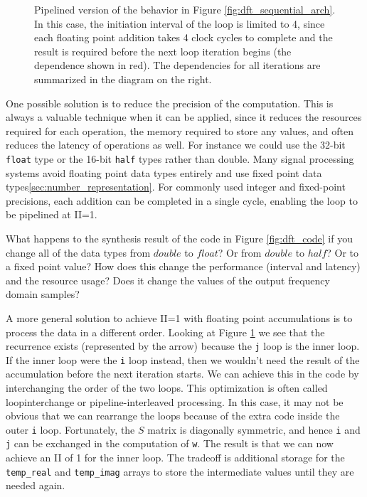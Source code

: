 \begin{figure}
\centering
\begin{tiny}

\end{tiny}
\caption{Pipelined version of the behavior in Figure \ref{fig:dft_sequential_arch}.  In this case, the initiation interval of the loop is limited to 4, since each floating point addition takes 4 clock cycles to complete and the result is required before the next loop iteration begins (the dependence shown in red).  The dependencies  for all iterations are summarized in the diagram on the right.}
\label{fig:dft_recurrence_behavior}
\end{figure}

One possible solution is to reduce the precision of the computation.  This is always a valuable technique when it can be applied, since it reduces the resources required for each operation, the memory required to store any values, and often reduces the latency of operations as well.  For instance we could use the 32-bit \lstinline|float| type or the 16-bit \lstinline|half| types rather than double.  Many signal processing systems avoid floating point data types entirely and use fixed point data types\ref{sec:number_representation}.  For commonly used integer and fixed-point precisions, each addition can be completed in a single cycle, enabling the loop to be pipelined at II=1.

\begin{exercise}
What happens to the synthesis result of the code in Figure \ref{fig:dft_code} if you change all of the data types from $double$ to $float$? Or from $double$ to $half$? Or to a fixed point value? How does this change the performance (interval and latency) and the resource usage? Does it change the values of the output frequency domain samples?
\end{exercise}

A more general solution to achieve II=1 with floating point accumulations is to process the data in a different order.  Looking at Figure \ref{fig:dft_recurrence_behavior} we see that the recurrence exists (represented by the arrow) because the \lstinline|j| loop is the inner loop.  If the inner loop were the \lstinline|i| loop instead, then we wouldn't need the result of the accumulation before the next iteration starts.  We can achieve this in the code by interchanging the order of the two loops.  This optimization is often called \gls{loopinterchange} or pipeline-interleaved processing\cite{lee87sdfArchitecture}.  In this case, it may not be obvious that we can rearrange the loops because of the extra code inside the outer \lstinline|i| loop.  Fortunately, the $S$ matrix is diagonally symmetric, and hence \lstinline|i| and \lstinline|j| can be exchanged in the computation of \lstinline|w|.  The result is that we can now achieve an II of 1 for the inner loop.  The tradeoff is additional storage for the \lstinline|temp_real| and \lstinline|temp_imag| arrays to store the intermediate values until they are needed again.


